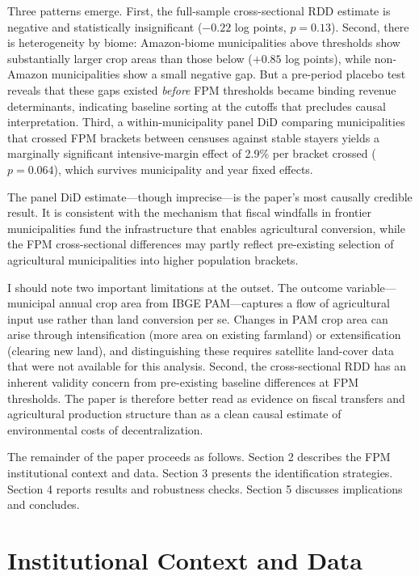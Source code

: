 \documentclass[12pt]{article}
\begin{document}
Three patterns emerge. First, the full-sample cross-sectional RDD estimate is negative and statistically insignificant ($-0.22$ log points, $p=0.13$). Second, there is heterogeneity by biome: Amazon-biome municipalities above thresholds show substantially larger crop areas than those below ($+0.85$ log points), while non-Amazon municipalities show a small negative gap. But a pre-period placebo test reveals that these gaps existed \textit{before} FPM thresholds became binding revenue determinants, indicating baseline sorting at the cutoffs that precludes causal interpretation. Third, a within-municipality panel DiD comparing municipalities that crossed FPM brackets between censuses against stable stayers yields a marginally significant intensive-margin effect of 2.9\% per bracket crossed ($p=0.064$), which survives municipality and year fixed effects.

The panel DiD estimate---though imprecise---is the paper's most causally credible result. It is consistent with the mechanism that fiscal windfalls in frontier municipalities fund the infrastructure that enables agricultural conversion, while the FPM cross-sectional differences may partly reflect pre-existing selection of agricultural municipalities into higher population brackets.

I should note two important limitations at the outset. The outcome variable---municipal annual crop area from IBGE PAM---captures a flow of agricultural input use rather than land conversion per se. Changes in PAM crop area can arise through intensification (more area on existing farmland) or extensification (clearing new land), and distinguishing these requires satellite land-cover data that were not available for this analysis. Second, the cross-sectional RDD has an inherent validity concern from pre-existing baseline differences at FPM thresholds. The paper is therefore better read as evidence on fiscal transfers and agricultural production structure than as a clean causal estimate of environmental costs of decentralization.

The remainder of the paper proceeds as follows. Section 2 describes the FPM institutional context and data. Section 3 presents the identification strategies. Section 4 reports results and robustness checks. Section 5 discusses implications and concludes.

\section{Institutional Context and Data}
\end{document}
